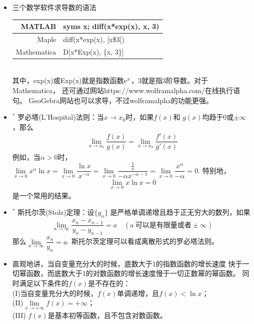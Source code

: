 \begin{itemize}[leftmargin=\inteval{\myitemleftmargin}pt,itemsep=
   \inteval{\myitemitempsep}pt,topsep=\inteval{\myitemtopsep}pt]
\item 三个数学软件求导数的语法 
\begin{table}[!htbp]
    \centering
    \begin{tabular}{|r|l|}
        \hline
        MATLAB & syms x; diff(x*exp(x), x, 3) \\ \hline
        Maple & diff(x*exp(x), [x\$3]) \\ \hline
        Mathematica & D[x*Exp(x), \{x, 3\}] \\ \hline
    \end{tabular}
\end{table} \\
其中，exp(x)或Exp(x)就是指数函数$ \mathrm{e}^x $，3就是指3阶导数。对于Mathematica，
还可通过网站https://www.wolframalpha.com/在线执行语句。
GeoGebra网站也可以求导，不过wolframalpha的功能更强。 

\item $^*$ 罗必塔(L'Hospital)法则：当$ x\to x_0 $时，如果$ f(x) $和
$ g(x) $均趋于0或$ \pm \infty $，那么
\begin{gather*}
   \lim\limits_{x\to x_0}\dfrac{f(x)}{g(x)}=
   \lim\limits_{x\to x_0}\dfrac{f'(x)}{g'(x)}
\end{gather*}
例如，当$ \alpha >0 $时，$ \lim\limits_{x\to 0}x^{\alpha}\ln x=\lim\limits_{x\to 0}
\dfrac{\ln x}{x^{-\alpha}}=\lim\limits_{x\to 0}\dfrac{\frac{1}{x}}{-\alpha x^{-\alpha -1}}=\lim\limits_{x\to 0}\dfrac{x^{\alpha}}{-\alpha}=0 $. 
特别地，
\begin{gather}\label{limit_xlnx=0}
	\lim\limits_{x\to 0} x\ln x=0 
\end{gather}
是一个常用的结果。

\item $^*$ 斯托尔茨(Stolz)定理：设$ \{y_n \} $
是严格单调递增且趋于正无穷大的数列，如果
\begin{gather*}
    \lim\limits_{n\to\infty}\dfrac{x_n-x_{n-1}}{y_n-y_{n-1}}=a \quad 
    (a\ \text{可以是有限量或者} \pm \infty) 
\end{gather*}
那么$ \lim\limits_{n\to\infty}\dfrac{x_n}{y_n}=a $. 
斯托尔茨定理可以看成离散形式的罗必塔法则。

\item 直观地讲，当自变量充分大的时候，底数大于1的指数函数的增长速度
快于一切幂函数，而底数大于1的对数函数的增长速度慢于一切正数幂的幂函数。
同时满足以下条件的$ f(x) $是不存在的：\\
(I)当自变量充分大的时候，$  f(x) $单调递增，且$ f(x)<\ln x $；\\
(II)$ \lim\limits_{x\to+\infty}f(x)=+\infty $；\\
(III) $ f(x) $是基本初等函数，且不包含对数函数。


\end{itemize}
